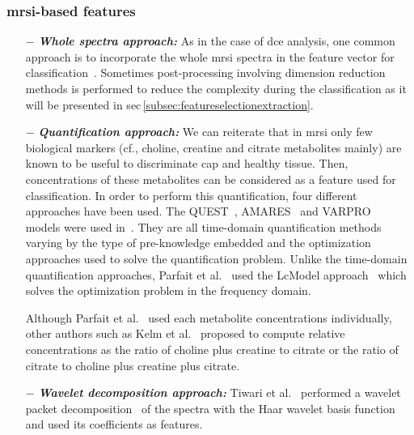 \subsubsection{\ac{mrsi}-based features}

\begin{enumerate}[leftmargin=*]

\item[$-$] \textbf{\textit{Whole spectra approach:}} As in the case of \ac{dce} analysis, one common approach is to incorporate the whole \ac{mrsi} spectra in the feature vector for classification~\cite{Kelm2007,Parfait2012,Tiwari2007,Tiwari2009,Tiwari2013,Tiwari2009a,Tiwari2010,Viswanath2008a,Matulewicz2013}. Sometimes post-processing involving dimension reduction methods is performed to reduce the complexity during the classification as it will be presented in \ac{sec}\,\ref{subsec:featureselectionextraction}.

\item[$-$] \textbf{\textit{Quantification approach:}} We can reiterate that in \ac{mrsi} only few biological markers (cf., choline, creatine and citrate metabolites mainly) are known to be useful to discriminate \ac{cap} and healthy tissue. Then, concentrations of these metabolites can be considered as a feature used for classification. In order to perform this quantification, four different approaches have been used. The QUEST~\cite{Ratiney2005}, AMARES~\cite{Vanhamme1997} and VARPRO~\cite{Coleman1993} models were used in~\cite{Kelm2007}. They are all time-domain quantification methods varying by the type of pre-knowledge embedded and the optimization approaches used to solve the quantification problem. Unlike the time-domain quantification approaches, Parfait et al.~\cite{Parfait2012} used the LcModel approach~\cite{Provencher1993} which solves the optimization problem in the frequency domain.

Although Parfait et al.~\cite{Parfait2012} used each metabolite concentrations individually, other authors such as Kelm et al.~\cite{Kelm2007} proposed to compute relative concentrations as the ratio of choline plus creatine to citrate or the ratio of citrate to choline plus creatine plus citrate. 
\item[$-$] \textbf{\textit{Wavelet decomposition approach:}} Tiwari et al.~\cite{Tiwari2012} performed a wavelet packet decomposition~\cite{Coifman1992} of the spectra with the Haar wavelet basis function and used its coefficients as features.

\end{enumerate}

